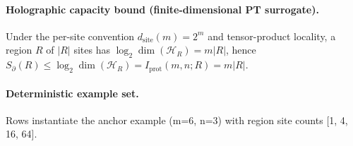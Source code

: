 \paragraph{Holographic capacity bound (finite-dimensional PT surrogate).} \AuditTag Under the per-site convention $d_{\mathrm{site}}(m)=2^m$ and tensor-product locality, a region $R$ of $|R|$ sites has $\log_2\dim(\mathcal{H}_R)=m|R|$, hence $S_{\partial}(R)\le \log_2\dim(\mathcal{H}_R)=I_{\mathrm{prot}}(m,n;R)=m|R|$.
\paragraph{Deterministic example set.} \AuditTag Rows instantiate the anchor example (m=6, n=3) with region site counts [1, 4, 16, 64].